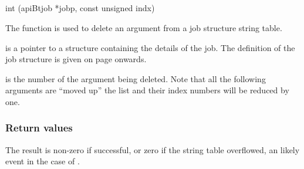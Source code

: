 \subsection{\funcnameXBdelarg{}}

\begin{expara}

int \funcnameXBdelarg{}(apiBtjob *jobp, const unsigned indx)

\end{expara}

The function \funcXBdelarg{} is used to delete an argument from a job structure string table.

 is a pointer to a structure containing the details of the job. The definition of the job structure is given on
page \pageref{bkm:Jobstructure} onwards.

 is the number of the argument being deleted. Note that all the following arguments are ``moved up'' the list and their index numbers will be reduced by one.

\subsubsection{Return values}
The result is non-zero if successful, or zero if the string table overflowed, an likely event in the case of \funcXBdelarg{}.

